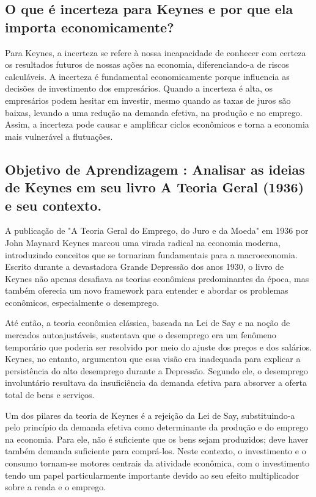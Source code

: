 \documentclass[a4paper,12pt]{article}[abntex2]
\begin{document}
\subsection{\textbf{O que é incerteza para Keynes e por que ela importa economicamente?}}
 Para Keynes, a incerteza se refere à nossa incapacidade de conhecer com certeza os resultados futuros de nossas ações na economia, diferenciando-a de riscos calculáveis. A incerteza é fundamental economicamente porque influencia as decisões de investimento dos empresários. Quando a incerteza é alta, os empresários podem hesitar em investir, mesmo quando as taxas de juros são baixas, levando a uma redução na demanda efetiva, na produção e no emprego. Assim, a incerteza pode causar e amplificar ciclos econômicos e torna a economia mais vulnerável a flutuações.
\subsection{\textbf{Objetivo de Aprendizagem : Analisar as ideias de Keynes em seu livro A Teoria Geral (1936) e seu contexto.}}
A publicação de "A Teoria Geral do Emprego, do Juro e da Moeda" em 1936 por John Maynard Keynes marcou uma virada radical na economia moderna, introduzindo conceitos que se tornariam fundamentais para a macroeconomia. Escrito durante a devastadora Grande Depressão dos anos 1930, o livro de Keynes não apenas desafiava as teorias econômicas predominantes da época, mas também oferecia um novo framework para entender e abordar os problemas econômicos, especialmente o desemprego.

Até então, a teoria econômica clássica, baseada na Lei de Say e na noção de mercados autoajustáveis, sustentava que o desemprego era um fenômeno temporário que poderia ser resolvido por meio do ajuste dos preços e dos salários. Keynes, no entanto, argumentou que essa visão era inadequada para explicar a persistência do alto desemprego durante a Depressão. Segundo ele, o desemprego involuntário resultava da insuficiência da demanda efetiva para absorver a oferta total de bens e serviços.

Um dos pilares da teoria de Keynes é a rejeição da Lei de Say, substituindo-a pelo princípio da demanda efetiva como determinante da produção e do emprego na economia. Para ele, não é suficiente que os bens sejam produzidos; deve haver também demanda suficiente para comprá-los. Neste contexto, o investimento e o consumo tornam-se motores centrais da atividade econômica, com o investimento tendo um papel particularmente importante devido ao seu efeito multiplicador sobre a renda e o emprego.
\end{document}
